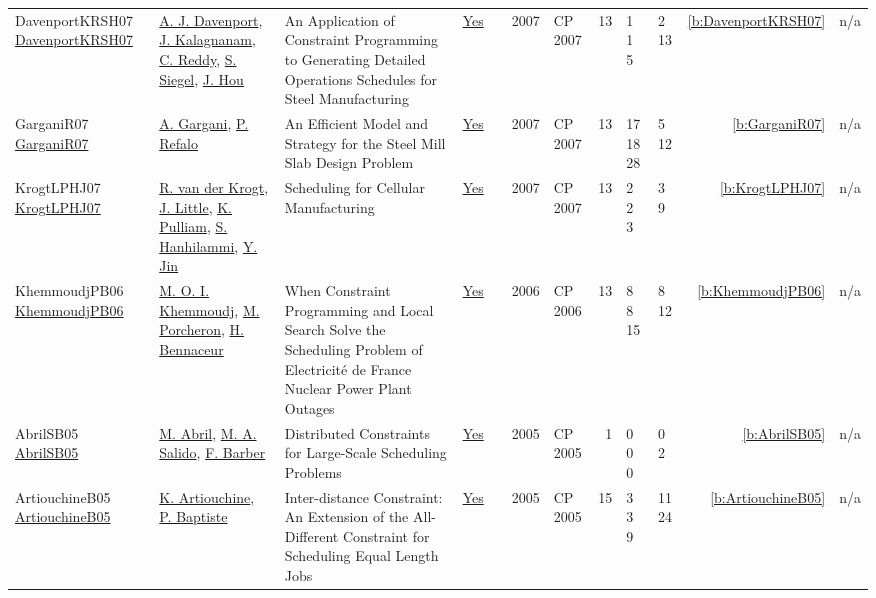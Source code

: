 {\begin{longtable}{>{\raggedright\arraybackslash}p{3cm}>{\raggedright\arraybackslash}p{4.5cm}>{\raggedright\arraybackslash}p{6.0cm}rrrp{2.5cm}rp{1cm}p{1cm}rr}
DavenportKRSH07 \href{https://doi.org/10.1007/978-3-540-74970-7_7}{DavenportKRSH07} & \hyperref[auth:a248]{A. J. Davenport}, \hyperref[auth:a249]{J. Kalagnanam}, \hyperref[auth:a250]{C. Reddy}, \hyperref[auth:a251]{S. Siegel}, \hyperref[auth:a252]{J. Hou} & \cellcolor{gold!20}An Application of Constraint Programming to Generating Detailed Operations Schedules for Steel Manufacturing & \href{../works/DavenportKRSH07.pdf}{Yes} & \cite{DavenportKRSH07} & 2007 & CP 2007 & 13 & 1 1 5 & 2 13 & \ref{b:DavenportKRSH07} & n/a\\
GarganiR07 \href{https://doi.org/10.1007/978-3-540-74970-7_8}{GarganiR07} & \hyperref[auth:a253]{A. Gargani}, \hyperref[auth:a254]{P. Refalo} & An Efficient Model and Strategy for the Steel Mill Slab Design Problem & \href{../works/GarganiR07.pdf}{Yes} & \cite{GarganiR07} & 2007 & CP 2007 & 13 & 17 18 28 & 5 12 & \ref{b:GarganiR07} & n/a\\
KrogtLPHJ07 \href{https://doi.org/10.1007/978-3-540-74970-7_10}{KrogtLPHJ07} & \hyperref[auth:a255]{R. van der Krogt}, \hyperref[auth:a178]{J. Little}, \hyperref[auth:a256]{K. Pulliam}, \hyperref[auth:a257]{S. Hanhilammi}, \hyperref[auth:a258]{Y. Jin} & Scheduling for Cellular Manufacturing & \href{../works/KrogtLPHJ07.pdf}{Yes} & \cite{KrogtLPHJ07} & 2007 & CP 2007 & 13 & 2 2 3 & 3 9 & \ref{b:KrogtLPHJ07} & n/a\\
KhemmoudjPB06 \href{https://doi.org/10.1007/11889205_21}{KhemmoudjPB06} & \hyperref[auth:a259]{M. O. I. Khemmoudj}, \hyperref[auth:a260]{M. Porcheron}, \hyperref[auth:a261]{H. Bennaceur} & When Constraint Programming and Local Search Solve the Scheduling Problem of Electricit{\'{e}} de France Nuclear Power Plant Outages & \href{../works/KhemmoudjPB06.pdf}{Yes} & \cite{KhemmoudjPB06} & 2006 & CP 2006 & 13 & 8 8 15 & 8 12 & \ref{b:KhemmoudjPB06} & n/a\\
AbrilSB05 \href{https://doi.org/10.1007/11564751_75}{AbrilSB05} & \hyperref[auth:a270]{M. Abril}, \hyperref[auth:a153]{M. A. Salido}, \hyperref[auth:a271]{F. Barber} & \cellcolor{green!10}Distributed Constraints for Large-Scale Scheduling Problems & \href{../works/AbrilSB05.pdf}{Yes} & \cite{AbrilSB05} & 2005 & CP 2005 & 1 & 0 0 0 & 0 2 & \ref{b:AbrilSB05} & n/a\\
ArtiouchineB05 \href{https://doi.org/10.1007/11564751_8}{ArtiouchineB05} & \hyperref[auth:a262]{K. Artiouchine}, \hyperref[auth:a162]{P. Baptiste} & \cellcolor{green!10}Inter-distance Constraint: An Extension of the All-Different Constraint for Scheduling Equal Length Jobs & \href{../works/ArtiouchineB05.pdf}{Yes} & \cite{ArtiouchineB05} & 2005 & CP 2005 & 15 & 3 3 9 & 11 24 & \ref{b:ArtiouchineB05} & n/a\\

\end{longtable}}
